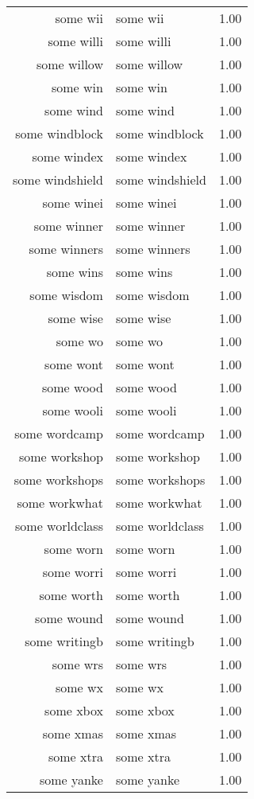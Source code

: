 \begin{table}[ht]
\begin{tabular}{rlr}
  some wii & some wii & 1.00 \\ 
  some willi & some willi & 1.00 \\ 
  some willow & some willow & 1.00 \\ 
  some win & some win & 1.00 \\ 
  some wind & some wind & 1.00 \\ 
  some windblock & some windblock & 1.00 \\ 
  some windex & some windex & 1.00 \\ 
  some windshield & some windshield & 1.00 \\ 
  some winei & some winei & 1.00 \\ 
  some winner & some winner & 1.00 \\ 
  some winners & some winners & 1.00 \\ 
  some wins & some wins & 1.00 \\ 
  some wisdom & some wisdom & 1.00 \\ 
  some wise & some wise & 1.00 \\ 
  some wo & some wo & 1.00 \\ 
  some wont & some wont & 1.00 \\ 
  some wood & some wood & 1.00 \\ 
  some wooli & some wooli & 1.00 \\ 
  some wordcamp & some wordcamp & 1.00 \\ 
  some workshop & some workshop & 1.00 \\ 
  some workshops & some workshops & 1.00 \\ 
  some workwhat & some workwhat & 1.00 \\ 
  some worldclass & some worldclass & 1.00 \\ 
  some worn & some worn & 1.00 \\ 
  some worri & some worri & 1.00 \\ 
  some worth & some worth & 1.00 \\ 
  some wound & some wound & 1.00 \\ 
  some writingb & some writingb & 1.00 \\ 
  some wrs & some wrs & 1.00 \\ 
  some wx & some wx & 1.00 \\ 
  some xbox & some xbox & 1.00 \\ 
  some xmas & some xmas & 1.00 \\ 
  some xtra & some xtra & 1.00 \\ 
  some yanke & some yanke & 1.00 \\ 

\end{tabular}
\end{table}
